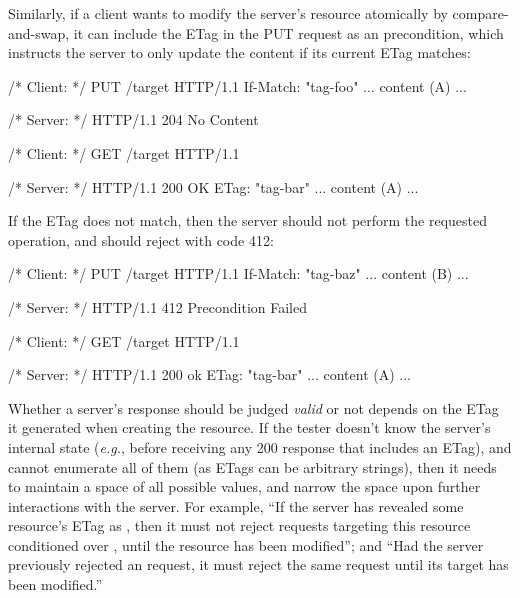 Similarly, if a client wants to modify the server's resource atomically by
compare-and-swap, it can include the ETag in the PUT request as an
 precondition, which instructs the server to only update the
content if its current ETag matches:
\begin{multicols}{2}
\begin{cpp}
  /* Client: */
  PUT /target HTTP/1.1
  If-Match: "tag-foo"
  ... content (A) ...
\end{cpp}
\columnbreak
\begin{cpp}
  /* Server: */
  HTTP/1.1 204 No Content
\end{cpp}
\end{multicols}
\begin{multicols}{2}
\begin{cpp}
  /* Client: */
  GET /target HTTP/1.1
\end{cpp}
\columnbreak
\begin{cpp}
  /* Server: */
  HTTP/1.1 200 OK
  ETag: "tag-bar"
  ... content (A) ...
\end{cpp}
\end{multicols}
If the ETag does not match, then the server should not perform the requested
operation, and should reject with code 412:
\begin{multicols}{2}
\begin{cpp}
  /* Client: */
  PUT /target HTTP/1.1
  If-Match: "tag-baz"
  ... content (B) ...
\end{cpp}
\columnbreak
\begin{cpp}
  /* Server: */
  HTTP/1.1 412 Precondition Failed
\end{cpp}
\end{multicols}

\begin{multicols}{2}
\begin{cpp}
  /* Client: */
  GET /target HTTP/1.1
\end{cpp}
\columnbreak
\begin{cpp}
  /* Server: */
  HTTP/1.1 200 ok
  ETag: "tag-bar"
  ... content (A) ...
\end{cpp}
\end{multicols}
Whether a server's response should be judged {\em valid} or not depends on the
ETag it generated when creating the resource.  If the tester doesn't know the
server's internal state ({\it e.g.}, before receiving any 200 response that
includes an ETag), and cannot enumerate all of them (as ETags can be arbitrary
strings), then it needs to maintain a space of all possible values, and narrow
the space upon further interactions with the server.  For example, ``If the
server has revealed some resource's ETag as , then it must
not reject requests targeting this resource conditioned over , until the resource has been modified''; and ``Had the server
previously rejected an  request, it must reject the same
request until its target has been modified.''

